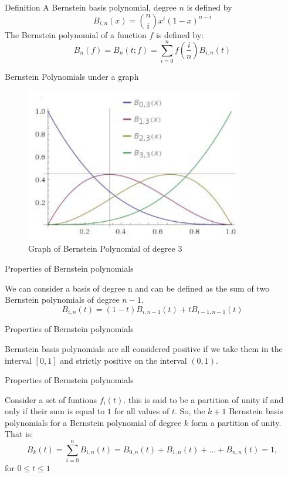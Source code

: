 \documentclass[mathserif,serif]{beamer}
\begin{document}
\begin{frame}{Definition}
A Bernstein basis polynomial, degree $n$ is defined by
\begin{equation}
\label{eq:bp:1}
 B_{i,n}(x)=\binom{n}{i}x^i(1-x)^{n-i} 
\end{equation}
The Bernstein polynomial of a function $f$ is defined by:
\begin{equation}
B_n(f)=B_n(t;f)=\sum_{i=0}^nf(\frac{i}{n})B_{i,n}(t)   
\end{equation}    
\end{frame}
\begin{frame}{Bernstein Polynomials under a graph}
\begin{figure}
    \centering
    \includegraphics[width=95mm]{BP.jpg}
    \caption{Graph of Bernstein Polynomial of degree 3}
    \label{fig:1}
\end{figure}    
\end{frame}
\begin{frame}{Properties of Bernstein polynomials}
\begin{theorem}
We can consider a basis of degree n and can be defined as the sum of two Bernstein polynomials of degree $n-1$.
\begin{equation*}
B_{i,n}(t)=(1-t)B_{i,n-1}(t)+tB_{i-1,n-1}(t)    
\end{equation*}
\end{theorem}
\end{frame}
\begin{frame}{Properties of Bernstein polynomials}
\begin{theorem}[Positivity]
Bernstein basis polynomials are all considered positive if we take them in the interval $[0,1]$ and strictly positive on the interval $(0,1)$.
\end{theorem}    
\end{frame}
\begin{frame}{Properties of Bernstein polynomials}
\begin{theorem}
Consider a set of funtions $f_i(t)$. this is said to be a partition of unity if and only if their sum is equal to $1$ for all values of $t$. So, the $k + 1$ Bernstein basis polynomials for a Bernstein polynomial of degree $k$ form a partition of unity. That is:
\begin{equation*}
B_k(t)=\sum_{i=0}^nB_{i,n}(t)= B_{0,n}(t)+B_{1,n}(t)+...+B_{n,n}(t)=1,
\end{equation*}
for $0\leq t\leq 1$  
\end{theorem}    
\end{frame}
\end{document}
